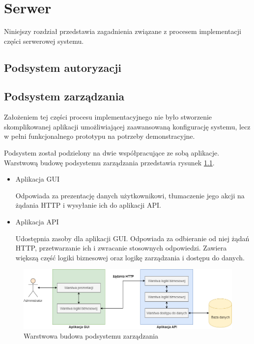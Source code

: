 \chapter{Serwer}
\label{chap:server}

    Niniejszy rozdział przedstawia zagadnienia związane z procesem implementacji części serwerowej systemu. 

    \section{Podsystem autoryzacji}


    \section{Podsystem zarządzania}

    	Założeniem tej części procesu implementacyjnego nie było stworzenie skomplikowanej aplikacji umożliwiającej zaawansowaną konfigurację systemu, lecz w pełni funkcjonalnego prototypu na potrzeby demonstracyjne.

    	Podsystem został podzielony na dwie współpracujące ze sobą aplikacje. Warstwową budowę podsystemu zarządzania przedstawia rysunek \ref{fig:mngmt_subs_layers}.

    	\begin{itemize}
    		\item Aplikacja GUI

    			Odpowiada za prezentację danych użytkownikowi, tłumaczenie jego akcji na żądania HTTP i wysyłanie ich do aplikacji API.

    		\item Aplikacja API

    			Udostępnia zasoby dla aplikacji GUI. Odpowiada za odbieranie od niej żądań HTTP, przetwarzanie ich i zwracanie stosownych odpowiedzi. Zawiera większą część logiki biznesowej oraz logikę zarządzania i dostępu do danych.
    	\end{itemize}

        \begin{figure}[]
            \centering
            \includegraphics[width=\textwidth]{chapters/images/mngmt_subsystem_layers.png}
            \caption{Warstwowa budowa podsystemu zarządzania}
            \label{fig:mngmt_subs_layers}
        \end{figure}

